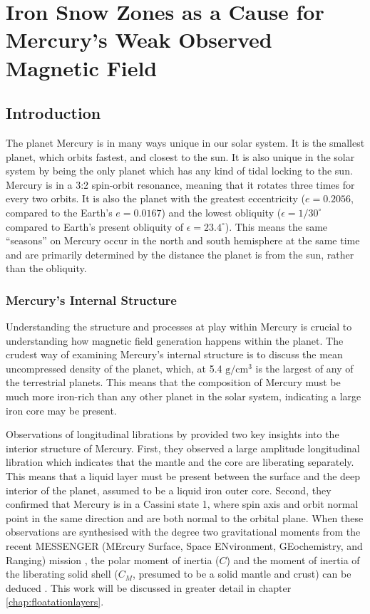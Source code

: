 \chapter{Iron Snow Zones as a Cause for Mercury's Weak Observed Magnetic Field}
\label{chap:doublesnowstates}
\section{Introduction}
The planet Mercury is in many ways unique in our solar system. It is the smallest planet, which orbits fastest, and closest to the sun. It is also unique in the solar system by being the only planet which has any kind of tidal locking to the sun. Mercury is in a 3:2 spin-orbit resonance, meaning that it rotates three times for every two orbits. It is also the planet with the greatest eccentricity ($e=0.2056$, compared to the Earth's $e=0.0167$) and the lowest obliquity ($\epsilon=1/30^\circ$ compared to Earth's present obliquity of $\epsilon=23.4^\circ$). This means the same ``seasons'' on Mercury occur in the north and south hemisphere at the same time and are primarily determined by the distance the planet is from the sun, rather than the obliquity.

\subsection{Mercury's Internal Structure}
Understanding the structure and processes at play within Mercury is crucial to understanding how magnetic field generation happens within the planet. The crudest way of examining Mercury's internal structure is to discuss the mean uncompressed density of the planet, which, at 5.4 $\textrm{g}/\textrm{cm}^3$ is the largest of any of the terrestrial planets. This means that the composition of Mercury must be much more iron-rich than any other planet in the solar system, indicating a large iron core may be present. 

Observations of longitudinal librations by \citet{margot2007} provided two key insights into the interior structure of Mercury. First, they observed a large amplitude longitudinal libration which indicates that the mantle and the core are liberating separately. This means that a liquid layer must be present between the surface and the deep interior of the planet, assumed to be a liquid iron outer core. Second, they confirmed that Mercury is in a Cassini state 1, where spin axis and orbit normal point in the same direction and are both normal to the orbital plane. When these observations are synthesised with the degree two gravitational moments from the recent MESSENGER (MErcury Surface, Space ENvironment, GEochemistry, and Ranging) mission \citep{smith2012}, the polar moment of inertia ($C$) and the moment of inertia of the liberating solid shell ($C_M$, presumed to be a solid mantle and crust) can be deduced \citep{peale1969}. This work will be discussed in greater detail in chapter \ref{chap:floatationlayers}.

